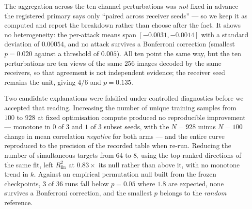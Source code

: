 \documentclass{article}
\theoremstyle{definition}
\begin{document}
The aggregation across the ten channel perturbations was \emph{not} fixed in advance --- the
registered primary says only ``paired across receiver seeds'' --- so we keep it as
computed and report the breakdown rather than choose after the fact. It shows no
heterogeneity: the per-attack means span $[-0.0031,-0.0014]$ with a standard deviation of
$0.00054$, and no attack survives a Bonferroni correction (smallest $p=0.020$ against a
threshold of $0.005$). All ten point the same way, but the ten perturbations are ten views
of the same $256$ images decoded by the same receivers, so that agreement is not
independent evidence; the receiver seed remains the unit, giving $4/6$ and $p=0.135$.

Two candidate explanations were falsified under controlled diagnostics before we accepted
that reading. Increasing the number of unique training samples from $100$ to $928$ at
fixed optimisation compute produced no reproducible improvement --- monotone in $0$ of $3$
and $1$ of $3$ subset seeds, with the $N{=}928$ minus $N{=}100$ change in mean correlation
\emph{negative} for both arms --- and the entire curve reproduced to the precision of the
recorded table when re-run. Reducing the number of simultaneous targets from $64$ to $8$,
using the top-ranked directions of the same fit, left $R^2_{\mathrm{lin}}$ at $0.83\times$
its null rather than above it, with no monotone trend in $k$. Against an empirical
permutation null built from the frozen checkpoints, $3$ of $36$ runs fall below $p=0.05$
where $1.8$ are expected, none survives a Bonferroni correction, and the smallest $p$
belongs to the \emph{random} reference.




\end{document}
